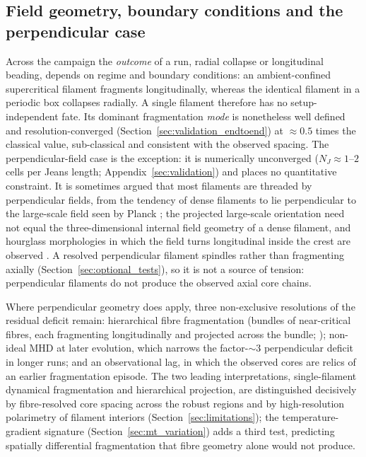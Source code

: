 \documentclass[usenatbib,twoside,twocolumn]{mnras}
\begin{document}
\subsection{Field geometry, boundary conditions and the perpendicular case}
\label{sec:why_mhd_fails}

Across the campaign the \emph{outcome} of a run, radial collapse or longitudinal beading, depends on regime and boundary conditions: an ambient-confined supercritical filament fragments longitudinally, whereas the identical filament in a periodic box collapses radially. A single filament therefore has no setup-independent fate. Its dominant fragmentation \emph{mode} is nonetheless well defined and resolution-converged (Section~\ref{sec:validation_endtoend}) at $\approx0.5$ times the classical value, sub-classical and consistent with the observed spacing. The perpendicular-field case is the exception: it is numerically unconverged ($N_J\approx1$--$2$ cells per Jeans length; Appendix~\ref{sec:validation}) and places no quantitative constraint. It is sometimes argued that most filaments are threaded by perpendicular fields, from the tendency of dense filaments to lie perpendicular to the large-scale field seen by Planck \citep{Planck2016}; the projected large-scale orientation need not equal the three-dimensional internal field geometry of a dense filament, and hourglass morphologies in which the field turns longitudinal inside the crest are observed \citep{Jadhav2026}. A resolved perpendicular filament spindles rather than fragmenting axially (Section~\ref{sec:optional_tests}), so it is not a source of tension: perpendicular filaments do not produce the observed axial core chains.

Where perpendicular geometry does apply, three non-exclusive resolutions of the residual deficit remain: hierarchical fibre fragmentation (bundles of near-critical fibres, each fragmenting longitudinally and projected across the bundle; \citealt{Hacar2013,Hacar2018,Yang2024}); non-ideal MHD at later evolution, which narrows the factor-$\sim3$ perpendicular deficit in longer runs; and an observational lag, in which the observed cores are relics of an earlier fragmentation episode. The two leading interpretations, single-filament dynamical fragmentation and hierarchical projection, are distinguished decisively by fibre-resolved core spacing across the robust regions and by high-resolution polarimetry of filament interiors (Section~\ref{sec:limitations}); the temperature-gradient signature (Section~\ref{sec:mt_variation}) adds a third test, predicting spatially differential fragmentation that fibre geometry alone would not produce.
\end{document}
